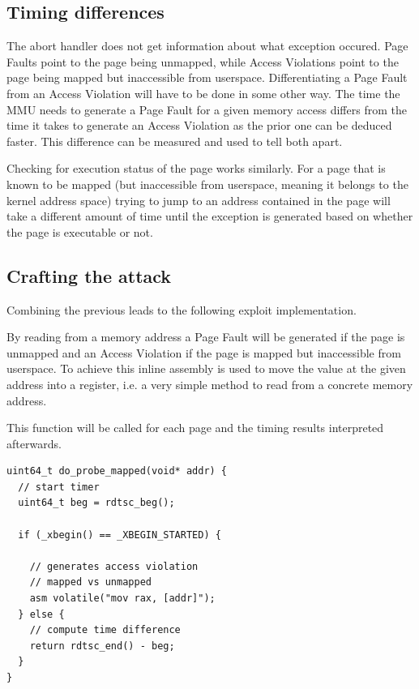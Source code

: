 \subsection{Timing differences}

The abort handler does not get information about what exception occured.
Page Faults point to the page being unmapped, while Access Violations point to the page being mapped but inaccessible from userspace.
Differentiating a Page Fault from an Access Violation will have to be done in some other way.
The time the MMU needs to generate a Page Fault for a given memory access differs from the time it takes to generate an Access Violation as the prior one can be deduced faster.
This difference can be measured and used to tell both apart.

Checking for execution status of the page works similarly.
For a page that is known to be mapped (but inaccessible from userspace, meaning it belongs to the kernel address space) trying to jump to an address contained in the page will take a different amount of time until the exception is generated based on whether the page is executable or not.

\subsection{Crafting the attack}

Combining the previous leads to the following exploit implementation.

By reading from a memory address a Page Fault will be generated if the page is unmapped and an Access Violation if the page is mapped but inaccessible from userspace.
To achieve this inline assembly is used to move the value at the given address into a register, i.e. a very simple method to read from a concrete memory address.

This function will be called for each page and the timing results interpreted afterwards.

\begin{lstlisting}
uint64_t do_probe_mapped(void* addr) {
  // start timer
  uint64_t beg = rdtsc_beg();

  if (_xbegin() == _XBEGIN_STARTED) {

    // generates access violation
    // mapped vs unmapped
    asm volatile("mov rax, [addr]");
  } else {
    // compute time difference
    return rdtsc_end() - beg;
  }
}
\end{lstlisting}


